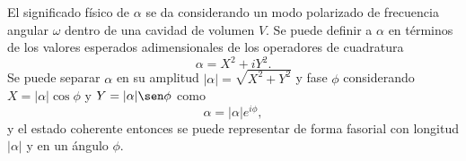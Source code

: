 El significado físico de $\alpha$ se da considerando un modo polarizado de frecuencia angular $\omega$ dentro de una cavidad de volumen $V$. Se puede definir a $\alpha$ en términos de los valores esperados adimensionales de los operadores de cuadratura
\begin{equation}
  \alpha = X^2 + iY^2.
\end{equation}
Se puede separar $\alpha$ en su amplitud $|\alpha|=\sqrt{X^2 + Y^2}$ y fase $\phi$ considerando $X = |\alpha|\cos\phi$ y $Y=|\alpha|\sen\phi$ como
\begin{equation}
  \alpha = |\alpha|e^{i\phi},
\end{equation}
y el estado coherente entonces se puede representar de forma fasorial con longitud $|\alpha|$ y en un ángulo $\phi$.
\begin{figure}[!h]
  \centering

  \begin{tikzpicture}[x=0.75pt,y=0.75pt,yscale=-1,xscale=1]


\end{tikzpicture}
\end{figure}
